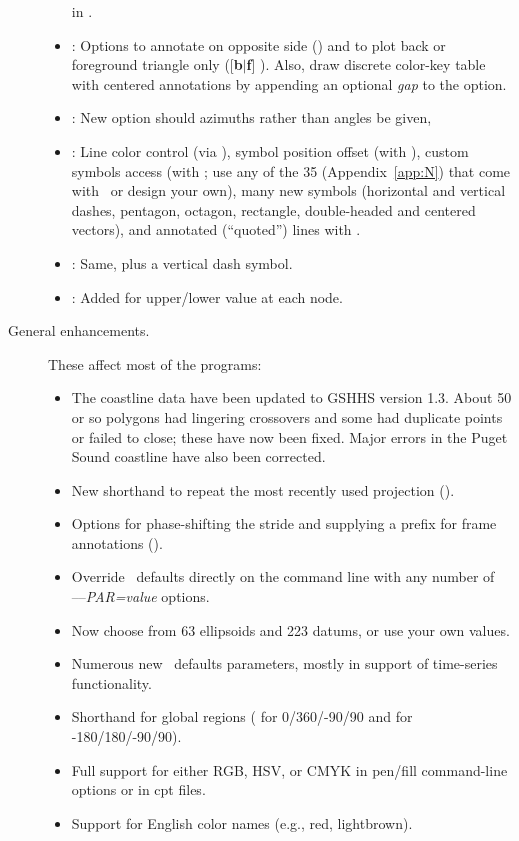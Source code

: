 \begin{description}
\begin{itemize}
in .
\item {}:	Options to annotate on opposite side () and to plot back or foreground
triangle only ([{\bf b$|$f}] ).  Also, draw discrete color-key table with centered annotations by appending an optional
{\it gap} to the  option. 
\item {}: 	New option  should azimuths rather than angles be given,
\item {}: 	Line color control (via ), symbol position offset (with ), custom symbols access 
(with ; use any of the 35 (Appendix~\ref{app:N}) that come with \GMT\ or design your own), many new symbols (horizontal and vertical dashes,
pentagon, octagon, rectangle, double-headed and centered vectors), and annotated (``quoted'') lines with .
\item {}: 	Same, plus a vertical dash symbol.
\item {}: 	Added  for upper/lower value at each node.
\end{itemize}
\item [General enhancements.]  These affect most of the programs:
\begin{itemize}
\item The coastline data have been updated to GSHHS version 1.3.  About 50 or so polygons had lingering
crossovers and some had duplicate points or failed to close; these have now been fixed. Major
errors in the Puget Sound coastline have also been corrected.
\item New shorthand to repeat the most recently used projection ().
\item Options for phase-shifting the stride and supplying a prefix for frame annotations ().
\item Override \GMT\ defaults directly on the command line with any number of {--}{--}\emph{PAR=value} options.
\item Now choose from 63 ellipsoids and 223 datums, or use your own values.
\item Numerous new \GMT\ defaults parameters, mostly in support of time-series functionality.
\item Shorthand for global regions ( for 0/360/-90/90 and  for -180/180/-90/90).
\item Full support for either RGB, HSV, or CMYK in pen/fill command-line options or in cpt files.
\item Support for English color names (e.g., red, lightbrown).

\end{itemize}
\end{description}
